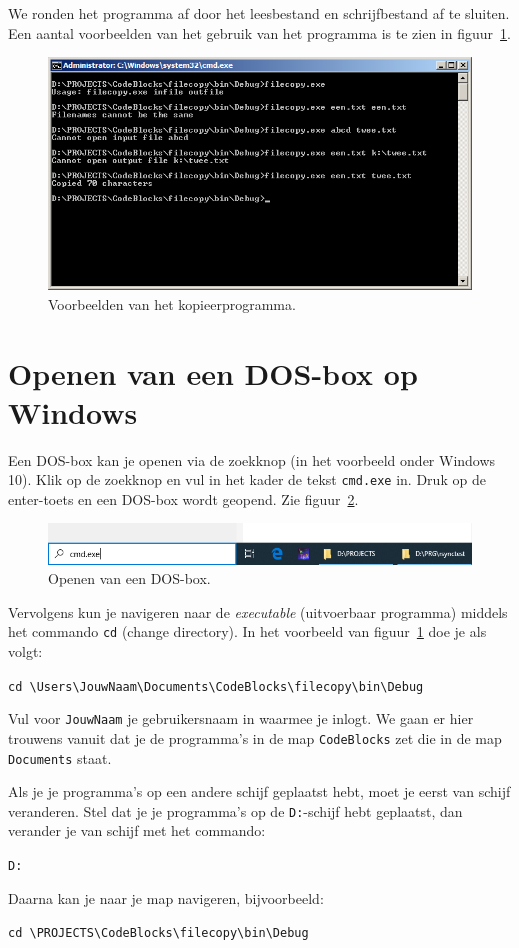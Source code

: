 \documentclass[a4paper,12pt,twoside]{article}
\begin{document}
We ronden het programma af door het leesbestand en schrijfbestand af te sluiten. Een
aantal voorbeelden van het gebruik van het programma is te zien in figuur~\ref{fig:filecopy}.

\begin{figure}[!ht]
\centering
\includegraphics[width=\textwidth]{filecopy.png}
\caption{Voorbeelden van het kopieerprogramma.}
\label{fig:filecopy}
\end{figure}

\section{Openen van een DOS-box op Windows}
Een DOS-box kan je openen via de zoekknop (in het voorbeeld onder Windows 10).
Klik op de zoekknop en vul in het kader de tekst \lstinline|cmd.exe| in. Druk op de
enter-toets en een DOS-box wordt geopend. Zie figuur~\ref{fig:cmdexe}.

\begin{figure}[!ht]
\centering
\includegraphics[scale=0.63]{cmdexe.png}
\caption{Openen van een DOS-box.}
\label{fig:cmdexe}
\end{figure}

Vervolgens kun je navigeren naar de \textsl{executable} (uitvoerbaar programma)
middels het commando \lstinline|cd| (change directory). In het voorbeeld van
figuur~\ref{fig:filecopy} doe je als volgt:

\lstinline|cd \Users\JouwNaam\Documents\CodeBlocks\filecopy\bin\Debug|

Vul voor \lstinline|JouwNaam| je gebruikersnaam in waarmee je inlogt. We gaan er hier
trouwens vanuit dat je de programma's in de map \lstinline|CodeBlocks| zet die in de map
\lstinline|Documents| staat.

Als je je programma's op een andere schijf geplaatst hebt, moet je eerst van schijf veranderen.
Stel dat je je programma's op de \lstinline|D:|-schijf hebt geplaatst, dan verander je van
schijf met het commando:

\lstinline|D:|

Daarna kan je naar je map navigeren, bijvoorbeeld:

\lstinline|cd \PROJECTS\CodeBlocks\filecopy\bin\Debug|
\end{document}
